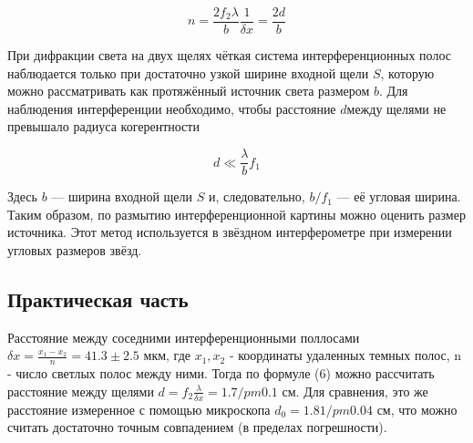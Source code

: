 \documentclass[a4paper, 12pt]{article}
\begin{document}
\begin{equation}\label{n}
n = \dfrac{2f_2 \lambda}{b} \dfrac{1}{\delta x} = \dfrac{2d}{b}
\end{equation}

При дифракции света на двух щелях чёткая система интерференционных полос наблюдается только при достаточно узкой ширине входной щели $ S $, которую можно рассматривать как протяжённый источник света размером $ b $. Для наблюдения интерференции необходимо, чтобы расстояние $ d $между щелями не превышало радиуса когерентности

\begin{equation}\label{}
d \ll \dfrac{\lambda}{b} f_1
\end{equation}

Здесь $ b $ --- ширина входной щели $ S $ и, следовательно, $  b/f_1 $ --- её угловая ширина. Таким образом, по размытию интерференционной картины можно оценить размер источника. Этот метод используется в звёздном интерферометре при измерении угловых размеров звёзд.

\subsection{Практическая часть}

Расстояние между соседними интерференционными поллосами $\delta x = \frac{x_1-x_2}{n} = 41.3 \pm 2.5$ мкм, где $x_1, x_2$ - координаты удаленных темных полос, n - число светлых полос между ними. Тогда по формуле (6) можно рассчитать расстояние между щелями $d=f_{2} \frac{\lambda}{\delta x} = 1.7 /pm 0.1$ см. Для сравнения, это же расстояние измеренное с помощью микроскопа $d_0 = 1.81 /pm 0.04$ см, что можно считать достаточно точным совпадением (в пределах погрешности).
\end{document}

